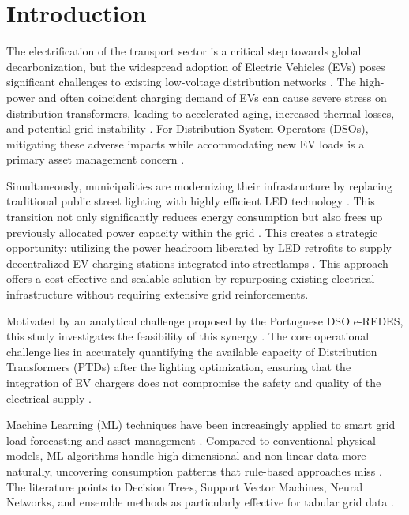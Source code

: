 \documentclass[conference]{IEEEtran}
\begin{document}
\section{Introduction}

The electrification of the transport sector is a critical step towards global decarbonization, but the widespread adoption of Electric Vehicles (EVs) poses significant challenges to existing low-voltage distribution networks \cite{Jain2023,IEA2024}. The high-power and often coincident charging demand of EVs can cause severe stress on distribution transformers, leading to accelerated aging, increased thermal losses, and potential grid instability \cite{Hilshey2011,Brinkel2020}. For Distribution System Operators (DSOs), mitigating these adverse impacts while accommodating new EV loads is a primary asset management concern \cite{Jain2023,Rajora2024}.

Simultaneously, municipalities are modernizing their infrastructure by replacing traditional public street lighting with highly efficient LED technology \cite{ISEP2026}. This transition not only significantly reduces energy consumption but also frees up previously allocated power capacity within the grid \cite{Chowdhury2025}. This creates a strategic opportunity: utilizing the power headroom liberated by LED retrofits to supply decentralized EV charging stations integrated into streetlamps \cite{PennState2025}. This approach offers a cost-effective and scalable solution by repurposing existing electrical infrastructure without requiring extensive grid reinforcements.

Motivated by an analytical challenge proposed by the Portuguese DSO e-REDES, this study investigates the feasibility of this synergy \cite{ISEP2026}. The core operational challenge lies in accurately quantifying the available capacity of Distribution Transformers (PTDs) after the lighting optimization, ensuring that the integration of EV chargers does not compromise the safety and quality of the electrical supply \cite{ISEP2026}.

Machine Learning (ML) techniques have been increasingly applied to smart grid load forecasting and asset management \cite{Rajora2024,ElShahat2024}. Compared to conventional physical models, ML algorithms handle high-dimensional and non-linear data more naturally, uncovering consumption patterns that rule-based approaches miss \cite{Vanting2021,Ding2022}. The literature points to Decision Trees, Support Vector Machines, Neural Networks, and ensemble methods as particularly effective for tabular grid data \cite{Rajora2024,ElShahat2024,Chen2016}.
\end{document}
